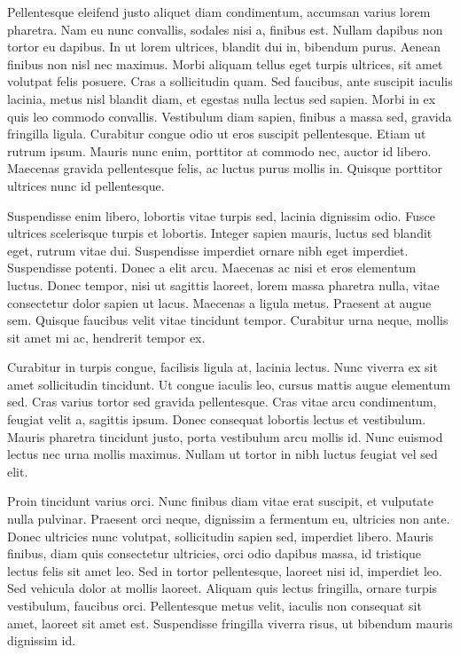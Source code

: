Pellentesque eleifend justo aliquet diam condimentum, accumsan varius lorem pharetra. Nam eu nunc convallis, sodales nisi a, finibus est. Nullam dapibus non tortor eu dapibus. In ut lorem ultrices, blandit dui in, bibendum purus. Aenean finibus non nisl nec maximus. Morbi aliquam tellus eget turpis ultrices, sit amet volutpat felis posuere. Cras a sollicitudin quam. Sed faucibus, ante suscipit iaculis lacinia, metus nisl blandit diam, et egestas nulla lectus sed sapien. Morbi in ex quis leo commodo convallis. Vestibulum diam sapien, finibus a massa sed, gravida fringilla ligula. Curabitur congue odio ut eros suscipit pellentesque. Etiam ut rutrum ipsum. Mauris nunc enim, porttitor at commodo nec, auctor id libero. Maecenas gravida pellentesque felis, ac luctus purus mollis in. Quisque porttitor ultrices nunc id pellentesque.

Suspendisse enim libero, lobortis vitae turpis sed, lacinia dignissim odio. Fusce ultrices scelerisque turpis et lobortis. Integer sapien mauris, luctus sed blandit eget, rutrum vitae dui. Suspendisse imperdiet ornare nibh eget imperdiet. Suspendisse potenti. Donec a elit arcu. Maecenas ac nisi et eros elementum luctus. Donec tempor, nisi ut sagittis laoreet, lorem massa pharetra nulla, vitae consectetur dolor sapien ut lacus. Maecenas a ligula metus. Praesent at augue sem. Quisque faucibus velit vitae tincidunt tempor. Curabitur urna neque, mollis sit amet mi ac, hendrerit tempor ex.

Curabitur in turpis congue, facilisis ligula at, lacinia lectus. Nunc viverra ex sit amet sollicitudin tincidunt. Ut congue iaculis leo, cursus mattis augue elementum sed. Cras varius tortor sed gravida pellentesque. Cras vitae arcu condimentum, feugiat velit a, sagittis ipsum. Donec consequat lobortis lectus et vestibulum. Mauris pharetra tincidunt justo, porta vestibulum arcu mollis id. Nunc euismod lectus nec urna mollis maximus. Nullam ut tortor in nibh luctus feugiat vel sed elit.

Proin tincidunt varius orci. Nunc finibus diam vitae erat suscipit, et vulputate nulla pulvinar. Praesent orci neque, dignissim a fermentum eu, ultricies non ante. Donec ultricies nunc volutpat, sollicitudin sapien sed, imperdiet libero. Mauris finibus, diam quis consectetur ultricies, orci odio dapibus massa, id tristique lectus felis sit amet leo. Sed in tortor pellentesque, laoreet nisi id, imperdiet leo. Sed vehicula dolor at mollis laoreet. Aliquam quis lectus fringilla, ornare turpis vestibulum, faucibus orci. Pellentesque metus velit, iaculis non consequat sit amet, laoreet sit amet est. Suspendisse fringilla viverra risus, ut bibendum mauris dignissim id.

